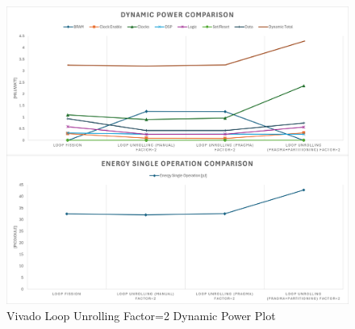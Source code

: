 \begin{figure}[H]
    \centering
    \includegraphics[width=\textwidth]{solutions/loop_unrolling/factor2/loopunrollingfactor2power.png}
    \caption{Vivado Loop Unrolling Factor=2 Dynamic Power Plot}
    \label{fig:vivado-loop-unrolling-factor2-solution-power-plot}
\end{figure}